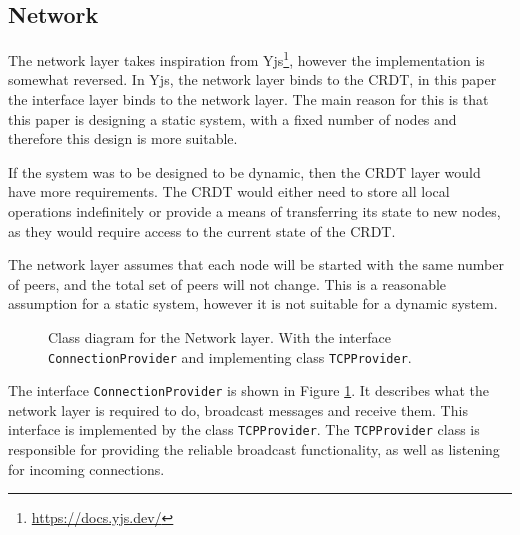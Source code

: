 \documentclass[12pt]{report}
\begin{document}
\subsection{Network}
The network layer takes inspiration from Yjs\footnote{\url{https://docs.yjs.dev/}}, however the implementation is somewhat reversed. In Yjs, the network layer binds to the CRDT, in this paper the interface layer binds to the network layer. The main reason for this is that this paper is designing a static system, with a fixed number of nodes and therefore this design is more suitable. \par

If the system was to be designed to be dynamic, then the CRDT layer would have more requirements. The CRDT would either need to store all local operations indefinitely or provide a means of transferring its state to new nodes, as they would require access to the current state of the CRDT.

The network layer assumes that each node will be started with the same number of peers, and the total set of peers will not change. This is a reasonable assumption for a static system, however it is not suitable for a dynamic system. \par

\begin{figure}[h]
    \centering
    \caption{Class diagram for the Network layer. With the interface \texttt{ConnectionProvider} and implementing class \texttt{TCPProvider}.}
    \label{fig:connection}
\end{figure}

The interface \texttt{ConnectionProvider} is shown in Figure \ref{fig:connection}. It describes what the network layer is required to do, broadcast messages and receive them. This interface is implemented by the class \texttt{TCPProvider}. The \texttt{TCPProvider} class is responsible for providing the reliable broadcast functionality, as well as listening for incoming connections. \par
\end{document}
